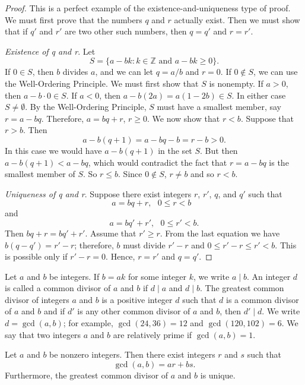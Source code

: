 \begin{proof}
This is a perfect example of the existence-and-uniqueness type of proof.  We must first prove that the numbers $q$ and $r$ actually  exist. Then we must show that if  $q'$ and $r'$ are two other such numbers, then $q = q'$ and $r = r'$. 
 
{\em Existence of q and r}.
Let
\[
S = \{ a - bk : k \in {\mathbb Z} \mbox{ and } a - bk \geq 0 \}.
\]
If $0 \in S$, then $b$ divides $a$, and  we can let $q = a/b$ and $r = 0$.  If $0 \notin S$, we can use the Well-Ordering Principle.  We must first show that $S$ is nonempty.  If $a > 0$, then $a - b \cdot 0 \in S$. If $a < 0$, then $a - b(2a) = a(1 - 2b) \in S$.  In either case $S \neq \emptyset$.  By the Well-Ordering Principle, $S$ must have a smallest member, say $r = a - bq$. Therefore, $a = bq + r$, $r \geq 0$. We now show that $r < b$. Suppose that $r > b$. Then   
\[
a - b(q + 1)= a - bq - b = r - b > 0.
\]
In this case we would have $a - b(q + 1)$ in the set $S$. But then $a - b(q + 1) < a - bq$, which would contradict the fact that $r = a - bq$ is the smallest member  of $S$. So $r \leq b$.  Since $0 \notin S$, $r \neq b$ and so $r < b$. 
 
{\em Uniqueness of q and r}.
Suppose there exist integers $r$, $r'$, $q$, and $q'$ such that
\[
a = bq + r, \mbox{ $0 \leq r < b$ }
\]
and
\[
a = bq' + r', \mbox{  $0 \leq r' < b$}.
\]
Then $ bq + r =  bq' + r'$.  Assume that $r' \geq r$.  From the last equation we have $b(q - q') = r' - r$; therefore, $b$ must divide $r' - r$ and $0 \leq r'- r \leq r' < b$.  This is possible only if $r' - r = 0$.  Hence, $r = r'$ and  $q = q'$. 
\end{proof}

\medskip

Let $a$ and $b$ be integers.  If $b = ak$ for some integer $k$, we write $a \mid b$\label{divides}.  An integer $d$ is called a {\bfi  common divisor\/} of $a$ and $b$ if $d \mid a$ and $d \mid b$.  The {\bfi greatest common divisor\/} of integers $a$ and $b$ is a positive integer $d$ such that $d$ is a common divisor  of $a$ and $b$ and if $d'$ is any other common divisor of $a$ and $b$, then $d' \mid d$.  We write $d = \gcd(a, b)$\label{greatestcd}; for example, $\gcd( 24, 36) = 12$ and $\gcd(120, 102) = 6$.  We say that two integers $a$ and $b$ are {\bfi relatively prime\/} if $\gcd( a, b ) = 1$. 

\begin{theorem}\label{integers_theorem_gcd}
Let $a$ and $b$ be nonzero integers. Then there exist integers $r$ and $s$ such that
\[
\gcd( a, b) = ar + bs.
\]
Furthermore, the greatest common divisor of $a$ and $b$ is unique.
\end{theorem}
 
